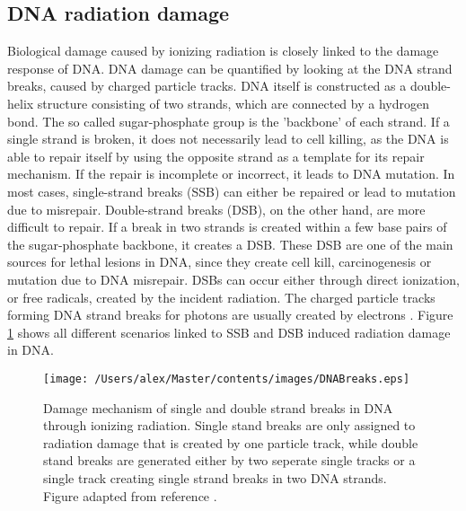 \subsection{DNA radiation damage}
Biological damage caused by ionizing radiation is closely linked to the damage response of DNA. DNA damage can be quantified by looking at the DNA strand breaks, caused by charged particle tracks. DNA itself is constructed as a double-helix structure consisting of two strands, which are connected by a hydrogen bond. The so called sugar-phosphate group is the 'backbone' of each strand. If a single strand is broken, it does not necessarily lead to cell killing, as the DNA is able to repair itself by using the opposite strand as a template for its repair mechanism. If the repair is incomplete or incorrect, it leads to DNA mutation. In most cases, single-strand breaks (SSB) can either be repaired or lead to mutation due to misrepair. Double-strand breaks (DSB), on the other hand, are more difficult to repair. If a break in two strands is created within a few base pairs of the sugar-phosphate backbone, it creates a DSB. These DSB are one of the main sources for lethal lesions in DNA, since they create cell kill, carcinogenesis or mutation due to DNA misrepair. DSBs can occur either through direct ionization, or free radicals, created by the incident radiation. The charged particle tracks forming DNA strand breaks for photons are usually created by electrons \cite{Alper}. Figure \ref{fig:DNABreaks} shows all different scenarios linked to SSB and DSB induced radiation damage in DNA. 
\begin{figure}[ht]
\centering
\texttt{[image: /Users/alex/Master/contents/images/DNABreaks.eps]}
\caption{Damage mechanism of single and double strand breaks in DNA through ionizing radiation. Single stand breaks are only assigned to radiation damage that is created by one particle track, while double stand breaks are generated either by two seperate single tracks or a single track creating single strand breaks in two DNA strands. Figure adapted from reference \cite{FreseThesis}.}
\label{fig:DNABreaks}
\end{figure}
